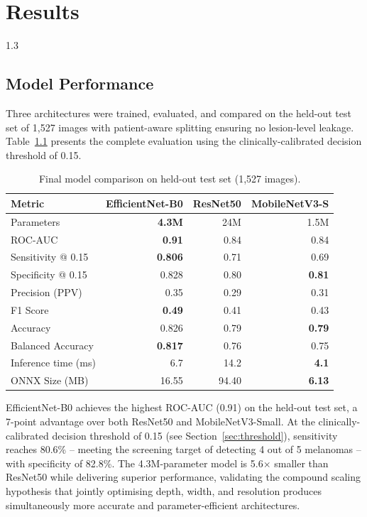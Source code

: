 
\chapter{Results}
\begin{spacing}{1.3}

\section{Model Performance}

Three architectures were trained, evaluated, and compared on the held-out test set of 1,527 images with patient-aware splitting ensuring no lesion-level leakage. Table~\ref{tab:final} presents the complete evaluation using the clinically-calibrated decision threshold of 0.15.

\begin{table}[H]
\centering
\caption{Final model comparison on held-out test set (1,527 images).}
\label{tab:final}
\begin{tabular}{lrrr}
\toprule
\textbf{Metric} & \textbf{EfficientNet-B0} & \textbf{ResNet50} & \textbf{MobileNetV3-S} \\
\midrule
Parameters          & \textbf{4.3M} & 24M  & 1.5M \\
ROC-AUC             & \textbf{0.91} & 0.84 & 0.84 \\
Sensitivity @ 0.15  & \textbf{0.806} & 0.71 & 0.69 \\
Specificity @ 0.15  & 0.828 & 0.80 & \textbf{0.81} \\
Precision (PPV)     & 0.35 & 0.29 & 0.31 \\
F1 Score            & \textbf{0.49} & 0.41 & 0.43 \\
Accuracy            & 0.826 & 0.79 & \textbf{0.79} \\
Balanced Accuracy   & \textbf{0.817} & 0.76 & 0.75 \\
Inference time (ms) & 6.7 & 14.2 & \textbf{4.1} \\
ONNX Size (MB)      & 16.55 & 94.40 & \textbf{6.13} \\
\bottomrule
\end{tabular}
\end{table}

EfficientNet-B0 achieves the highest ROC-AUC (0.91) on the held-out test set, a 7-point advantage over both ResNet50 and MobileNetV3-Small. At the clinically-calibrated decision threshold of 0.15 (see Section~\ref{sec:threshold}), sensitivity reaches 80.6\% -- meeting the screening target of detecting 4 out of 5 melanomas -- with specificity of 82.8\%. The 4.3M-parameter model is 5.6$\times$ smaller than ResNet50 while delivering superior performance, validating the compound scaling hypothesis that jointly optimising depth, width, and resolution produces simultaneously more accurate and parameter-efficient architectures.


\end{spacing}
